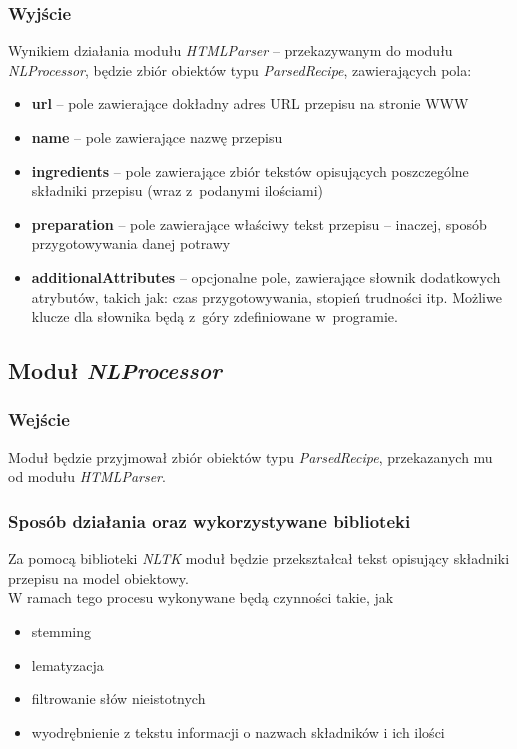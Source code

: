 \documentclass[11pt,a4paper]{article}
\begin{document}
\subsubsection{Wyjście}
Wynikiem działania modułu \textit{HTMLParser} -- przekazywanym do modułu \textit{NLProcessor}, będzie zbiór obiektów typu \textit{ParsedRecipe}, zawierających pola:
\begin{itemize}
  \item \textbf{url} -- pole zawierające dokładny adres URL przepisu na stronie WWW
  \item \textbf{name} -- pole zawierające nazwę przepisu
  \item \textbf{ingredients} -- pole zawierające zbiór tekstów opisujących poszczególne składniki przepisu (wraz z~podanymi ilościami)
  \item \textbf{preparation} -- pole zawierające właściwy tekst przepisu -- inaczej, sposób przygotowywania danej potrawy
  \item \textbf{additionalAttributes} -- opcjonalne pole, zawierające słownik dodatkowych atrybutów, takich jak: czas przygotowywania, stopień trudności itp. Możliwe klucze dla słownika będą z~góry zdefiniowane w~programie.
\end{itemize}

\newpage
\subsection{Moduł \textit{NLProcessor}}
\subsubsection{Wejście}
Moduł będzie przyjmował zbiór obiektów typu \textit{ParsedRecipe}, przekazanych mu od modułu \textit{HTMLParser}.
\subsubsection{Sposób działania oraz wykorzystywane biblioteki}
Za pomocą biblioteki \textit{NLTK} moduł będzie przekształcał tekst opisujący składniki przepisu na model obiektowy.\\ 
W ramach tego procesu wykonywane będą czynności takie, jak 
\begin{itemize}
	\item stemming
	\item lematyzacja 
	\item filtrowanie słów nieistotnych
	\item wyodrębnienie z tekstu informacji o nazwach składników i ich ilości
\end{itemize}
\end{document}
